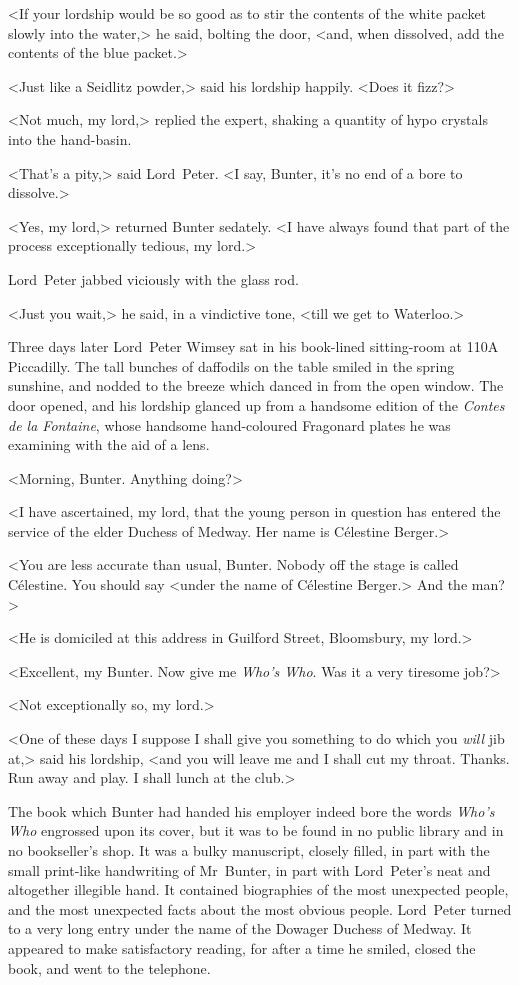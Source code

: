 <If your lordship would be so good as to stir the contents of the white packet slowly into the water,> he said, bolting the door, <and, when dissolved, add the contents of the blue packet.>

<Just like a Seidlitz powder,> said his lordship happily. <Does it fizz?>

<Not much, my lord,> replied the expert, shaking a quantity of hypo crystals into the hand-basin.

<That's a pity,> said Lord~Peter. <I say, Bunter, it's no end of a bore to dissolve.>

<Yes, my lord,> returned Bunter sedately. <I have always found that part of the process exceptionally tedious, my lord.>

Lord~Peter jabbed viciously with the glass rod.

<Just you wait,> he said, in a vindictive tone, <till we get to Waterloo.>

\divider
Three days later Lord~Peter Wimsey sat in his book-lined sitting-room at 110A Piccadilly. The tall bunches of daffodils on the table smiled in the spring sunshine, and nodded to the breeze which danced in from the open window. The door opened, and his lordship glanced up from a handsome edition of the \textit{Contes de la Fontaine}, whose handsome hand-coloured Fragonard plates he was examining with the aid of a lens.

<Morning, Bunter. Anything doing?>

<I have ascertained, my lord, that the young person in question has entered the service of the elder Duchess of Medway. Her name is Célestine Berger.>

<You are less accurate than usual, Bunter. Nobody off the stage is called Célestine. You should say <under the name of Célestine Berger.> And the man?>

<He is domiciled at this address in Guilford Street, Bloomsbury, my lord.>

<Excellent, my Bunter. Now give me \textit{Who's Who}. Was it a very tiresome job?>

<Not exceptionally so, my lord.>

<One of these days I suppose I shall give you something to do which you \textit{will} jib at,> said his lordship, <and you will leave me and I shall cut my throat. Thanks. Run away and play. I shall lunch at the club.>

The book which Bunter had handed his employer indeed bore the words \textit{Who's Who} engrossed upon its cover, but it was to be found in no public library and in no bookseller's shop. It was a bulky manuscript, closely filled, in part with the small print-like handwriting of Mr~Bunter, in part with Lord~Peter's neat and altogether illegible hand. It contained biographies of the most unexpected people, and the most unexpected facts about the most obvious people. Lord~Peter turned to a very long entry under the name of the Dowager Duchess of Medway. It appeared to make satisfactory reading, for after a time he smiled, closed the book, and went to the telephone.

